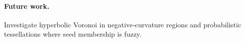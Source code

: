 \paragraph{Future work.}  Investigate hyperbolic Voronoi in negative‑curvature regions and
probabilistic tessellations where seed membership is fuzzy.




